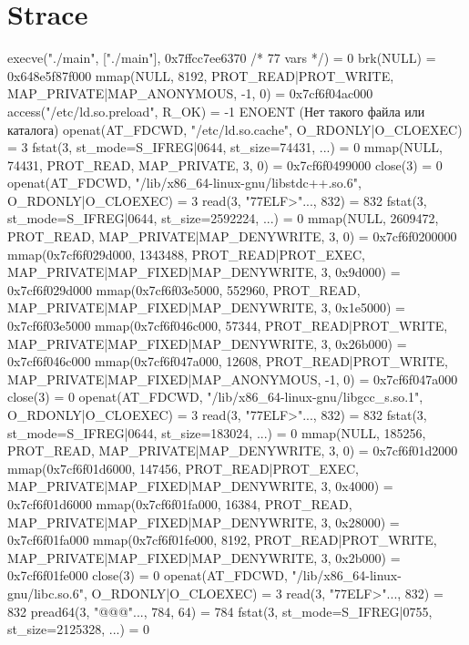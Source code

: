 \section{Strace}
\begin{breakableverbatim}
execve("./main", ["./main"], 0x7ffcc7ee6370 /* 77 vars */) = 0
brk(NULL)                               = 0x648e5f87f000
mmap(NULL, 8192, PROT\_READ|PROT\_WRITE, MAP\_PRIVATE|MAP\_ANONYMOUS, -1, 0) = 0x7cf6f04ac000
access("/etc/ld.so.preload", R\_OK)      = -1 ENOENT (Нет такого файла или каталога)
openat(AT\_FDCWD, "/etc/ld.so.cache", O\_RDONLY|O\_CLOEXEC) = 3
fstat(3, {st\_mode=S\_IFREG|0644, st\_size=74431, ...}) = 0
mmap(NULL, 74431, PROT\_READ, MAP\_PRIVATE, 3, 0) = 0x7cf6f0499000
close(3)                                = 0
openat(AT\_FDCWD, "/lib/x86\_64-linux-gnu/libstdc++.so.6", O\_RDONLY|O\_CLOEXEC) = 3
read(3, "\177ELF\2\1\1\3\0\0\0\0\0\0\0\0\3\0>\0\1\0\0\0\0\0\0\0\0\0\0\0"..., 832) = 832
fstat(3, {st\_mode=S\_IFREG|0644, st\_size=2592224, ...}) = 0
mmap(NULL, 2609472, PROT\_READ, MAP\_PRIVATE|MAP\_DENYWRITE, 3, 0) = 0x7cf6f0200000
mmap(0x7cf6f029d000, 1343488, PROT\_READ|PROT\_EXEC, MAP\_PRIVATE|MAP\_FIXED|MAP\_DENYWRITE, 3, 0x9d000) = 0x7cf6f029d000
mmap(0x7cf6f03e5000, 552960, PROT\_READ, MAP\_PRIVATE|MAP\_FIXED|MAP\_DENYWRITE, 3, 0x1e5000) = 0x7cf6f03e5000
mmap(0x7cf6f046c000, 57344, PROT\_READ|PROT\_WRITE, MAP\_PRIVATE|MAP\_FIXED|MAP\_DENYWRITE, 3, 0x26b000) = 0x7cf6f046c000
mmap(0x7cf6f047a000, 12608, PROT\_READ|PROT\_WRITE, MAP\_PRIVATE|MAP\_FIXED|MAP\_ANONYMOUS, -1, 0) = 0x7cf6f047a000
close(3)                                = 0
openat(AT\_FDCWD, "/lib/x86\_64-linux-gnu/libgcc\_s.so.1", O\_RDONLY|O\_CLOEXEC) = 3
read(3, "\177ELF\2\1\1\0\0\0\0\0\0\0\0\0\3\0>\0\1\0\0\0\0\0\0\0\0\0\0\0"..., 832) = 832
fstat(3, {st\_mode=S\_IFREG|0644, st\_size=183024, ...}) = 0
mmap(NULL, 185256, PROT\_READ, MAP\_PRIVATE|MAP\_DENYWRITE, 3, 0) = 0x7cf6f01d2000
mmap(0x7cf6f01d6000, 147456, PROT\_READ|PROT\_EXEC, MAP\_PRIVATE|MAP\_FIXED|MAP\_DENYWRITE, 3, 0x4000) = 0x7cf6f01d6000
mmap(0x7cf6f01fa000, 16384, PROT\_READ, MAP\_PRIVATE|MAP\_FIXED|MAP\_DENYWRITE, 3, 0x28000) = 0x7cf6f01fa000
mmap(0x7cf6f01fe000, 8192, PROT\_READ|PROT\_WRITE, MAP\_PRIVATE|MAP\_FIXED|MAP\_DENYWRITE, 3, 0x2b000) = 0x7cf6f01fe000
close(3)                                = 0
openat(AT\_FDCWD, "/lib/x86\_64-linux-gnu/libc.so.6", O\_RDONLY|O\_CLOEXEC) = 3
read(3, "\177ELF\2\1\1\3\0\0\0\0\0\0\0\0\3\0>\0\1\0\0\0\2\0\0\0\0\0"..., 832) = 832
pread64(3, "\6\0\0\0\4\0\0\0@\0\0\0\0\0\0\0@\0\0\0\0\0\0\0@\0\0\0\0\0\0\0"..., 784, 64) = 784
fstat(3, {st\_mode=S\_IFREG|0755, st\_size=2125328, ...}) = 0

\end{breakableverbatim}
